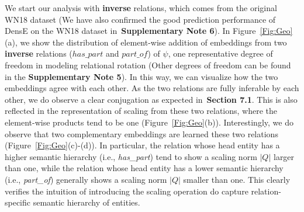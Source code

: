 \documentclass[11pt]{article}
\begin{document}
We start our analysis with \textbf{inverse} relations, which comes from the original WN18 dataset (We have also confirmed the good prediction performance of DensE on the WN18 dataset in~\textbf{Supplementary Note 6}). In Figure~\ref{Fig:Geo}(a), we show the distribution of element-wise addition of embeddings from two \textbf{inverse} relations (\(has\_part\) and \(part\_of\)) of \(\psi\), one representative degree of freedom in modeling relational rotation (Other degrees of freedom can be found in the \textbf{Supplementary Note 5}). In this way, we can visualize how the two embeddings agree with each other. As the two relations are fully inferable by each other, we do observe a clear conjugation as expected in~\textbf{Section 7.1}. This is also reflected in the representation of scaling from these two relations, where the element-wise products tend to be one (Figure~\ref{Fig:Geo}(b)). Interestingly, we do observe that two complementary embeddings are learned these two relations (Figure~\ref{Fig:Geo}(c)-(d)). In particular, the relation whose head entity has a higher semantic hierarchy (i.e., \textit{has\_part}) tend to show a scaling norm \(|Q|\) larger than one, while the relation whose head entity has a lower semantic hierarchy (i.e., \textit{part\_of}) generally shows a scaling norm \(|Q|\) smaller than one. This clearly verifies the intuition of introducing the scaling operation do capture relation-specific semantic hierarchy of entities.
\end{document}
